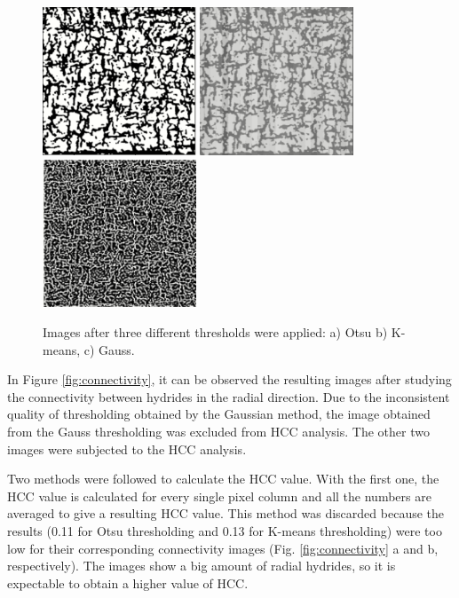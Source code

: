 \begin{figure}[h] %
    \centering
    \includegraphics[width=1.8in]{Figures/5-Results/ThOtsu.PNG}
    \includegraphics[width=1.8in]{Figures/5-Results/ThKmeans.PNG}
    \includegraphics[width=1.8in]{Figures/5-Results/ThGauss.PNG}
    \caption{Images after three different thresholds were applied: a) Otsu b) K-means, c) Gauss.}
    \label{fig:thresholding}
\end{figure}

\noindent
In Figure \ref{fig:connectivity}, it can be observed the resulting images after studying the connectivity between hydrides in the radial direction. Due to the inconsistent quality of thresholding obtained by the Gaussian method, the image obtained from the Gauss thresholding was excluded from HCC analysis. The other two images were subjected to the HCC analysis. 

Two methods were followed to calculate the HCC value. With the first one, the HCC value is calculated for every single pixel column and all the numbers are averaged to give a resulting HCC value. This method was discarded because the results (0.11 for Otsu thresholding and 0.13 for K-means thresholding) were too low for their corresponding connectivity images (Fig. \ref{fig:connectivity} a and b, respectively). The images show a big amount of radial hydrides, so it is expectable to obtain a higher value of HCC.

